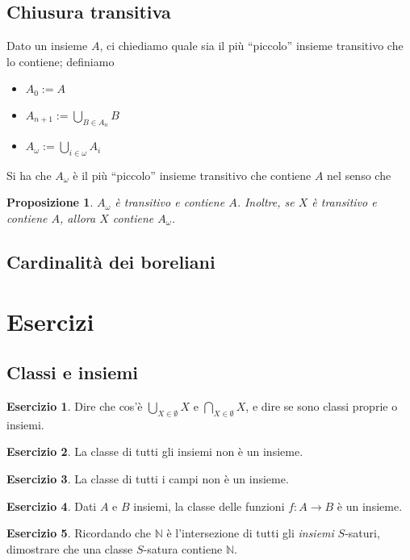 \documentclass[a4paper,10pt,oneside]{article}
\theoremstyle{plain}
\newtheorem{myprop}[mytheorem]{Proposizione}
\theoremstyle{definition}
\newtheorem{myex}{Esercizio}
\theoremstyle{remark}
\begin{document}
\subsection{Chiusura transitiva}
Dato un insieme $A$, ci chiediamo quale sia il più ``piccolo'' insieme transitivo che lo contiene; definiamo
\begin{itemize}
 \item $A_0:=A$
 \item $A_{n+1}:=\bigcup_{B\in A_n}B$
 \item $A_\omega:=\bigcup_{i\in\omega}A_i$
\end{itemize}
Si ha che $A_\omega$ è il più ``piccolo'' insieme transitivo che contiene $A$ nel senso che
\begin{myprop}
 $A_\omega$ è transitivo e contiene $A$. Inoltre, se $X$ è transitivo e contiene $A$, allora $X$ contiene $A_\omega$.
\end{myprop}

\subsection{Cardinalità dei boreliani}



\section{Esercizi}
\subsection{Classi e insiemi}
\begin{myex}
 Dire che cos'è $\bigcup_{X\in \emptyset} X$ e $\bigcap_{X\in \emptyset} X$, e dire se sono classi proprie o insiemi.
\end{myex}
\begin{myex}
 La classe di tutti gli insiemi non è un insieme.
\end{myex}
\begin{myex}
 La classe di tutti i campi non è un insieme.
\end{myex}


\begin{myex}
 Dati $A$ e $B$ insiemi, la classe delle funzioni $f: A\rightarrow B$ è un insieme.
\end{myex}

\begin{myex}\label{ex:classisature}
 Ricordando che $\mathbb N$ è l'intersezione di tutti gli \emph{insiemi} $S$-saturi, dimostrare che una classe $S$-satura contiene $\mathbb N$.
\end{myex}
\end{document}
